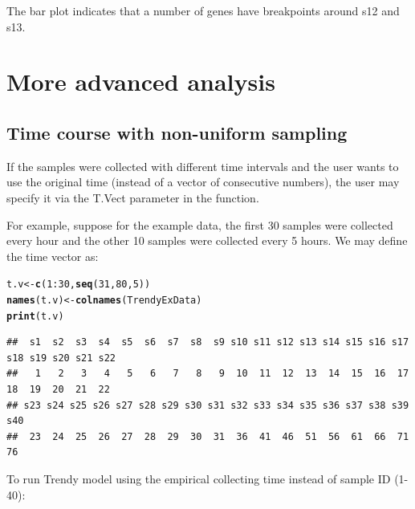 \documentclass{article}\usepackage[]{graphicx}\usepackage[usenames,dvipsnames]{color}
\makeatletter
\newcommand{\hlnum}[1]{\textcolor[rgb]{0.686,0.059,0.569}{#1}}%
\newcommand{\hlopt}[1]{\textcolor[rgb]{0,0,0}{#1}}%
\newcommand{\hlstd}[1]{\textcolor[rgb]{0.345,0.345,0.345}{#1}}%
\newcommand{\hlkwb}[1]{\textcolor[rgb]{0.69,0.353,0.396}{#1}}%
\newcommand{\hlkwd}[1]{\textcolor[rgb]{0.737,0.353,0.396}{\textbf{#1}}}%
\newenvironment{kframe}{%
 \def\at@end@of@kframe{}%
 \ifinner\ifhmode%
  \def\at@end@of@kframe{\end{minipage}}%
  \begin{minipage}{\columnwidth}%
 \fi\fi%
 \def\FrameCommand##1{\hskip\@totalleftmargin \hskip-\fboxsep
 \colorbox{shadecolor}{##1}\hskip-\fboxsep
     \hskip-\linewidth \hskip-\@totalleftmargin \hskip\columnwidth}%
 \MakeFramed {\advance\hsize-\width
   \@totalleftmargin\z@ \linewidth\hsize
   \@setminipage}}%
 {\par\unskip\endMakeFramed%
 \at@end@of@kframe}
\newenvironment{knitrout}{}{} %
\makeatother
\begin{document}
The bar plot indicates that a number of genes have breakpoints around s12 and s13.

\section{More advanced analysis}

\subsection{Time course with non-uniform sampling}
If the samples were collected with different time intervals and the user wants to
use the original time (instead of a vector of consecutive numbers),
the user may specify it via the T.Vect parameter in the  function.

For example, suppose for the example data, the first 30 samples were collected
every hour and the other 10 samples were collected every 5 hours. We may define
the time vector as:
\begin{knitrout}
\color{fgcolor}\begin{kframe}
\begin{alltt}
\hlstd{t.v} \hlkwb{<-} \hlkwd{c}\hlstd{(}\hlnum{1}\hlopt{:}\hlnum{30}\hlstd{,}\hlkwd{seq}\hlstd{(}\hlnum{31}\hlstd{,}\hlnum{80}\hlstd{,}\hlnum{5}\hlstd{))}
\hlkwd{names}\hlstd{(t.v)} \hlkwb{<-} \hlkwd{colnames}\hlstd{(TrendyExData)}
\hlkwd{print}\hlstd{(t.v)}
\end{alltt}
\begin{verbatim}
##  s1  s2  s3  s4  s5  s6  s7  s8  s9 s10 s11 s12 s13 s14 s15 s16 s17 s18 s19 s20 s21 s22 
##   1   2   3   4   5   6   7   8   9  10  11  12  13  14  15  16  17  18  19  20  21  22 
## s23 s24 s25 s26 s27 s28 s29 s30 s31 s32 s33 s34 s35 s36 s37 s38 s39 s40 
##  23  24  25  26  27  28  29  30  31  36  41  46  51  56  61  66  71  76
\end{verbatim}
\end{kframe}
\end{knitrout}

To run Trendy model using the empirical collecting time instead of sample ID (1-40):
\end{document}
